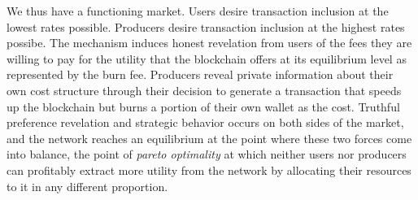 We thus have a functioning market. Users desire transaction inclusion at the lowest rates possible. Producers desire transaction inclusion at the highest rates possibe. The mechanism induces honest revelation from users of the fees they are willing to pay for the utility that the blockchain offers at its equilibrium level as represented by the burn fee. Producers reveal private information about their own cost structure through their decision to generate a transaction that speeds up the blockchain but burns a portion of their own wallet as the cost. Truthful preference revelation and strategic behavior occurs on both sides of the market, and the network reaches an equilibrium at the point where these two forces come into balance, the point of \textit{pareto optimality} at which neither users nor producers can profitably extract more utility from the network by allocating their resources to it in any different proportion.

